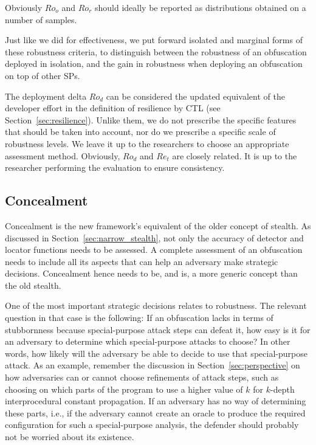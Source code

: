 \vspace{0.2cm}

Obviously $Ro_o$ and $Ro_r$ should ideally be reported as distributions obtained on a number of samples.

Just like we did for effectiveness, we put forward isolated and marginal forms of these robustness criteria, to distinguish between the robustness of an obfuscation deployed in isolation, and the gain in robustness when deploying an obfuscation on top of other SPs. 

The deployment delta $Ro_d$ can be considered the updated equivalent of the developer effort in the definition of resilience by CTL (see Section~\ref{sec:resilience}). Unlike them, we do not prescribe the specific features that should be taken into account, nor do we prescribe a specific scale of robustness levels. We leave it up to the researchers to choose an appropriate assessment method. 
Obviously, $Ro_d$ and $Re_t$ are closely related. It is up to the researcher performing the evaluation to ensure consistency. 



\subsection{Concealment}
Concealment is the new framework's equivalent of the older concept of stealth. As discussed in Section~\ref{sec:narrow_stealth}, not only the accuracy of detector and locator functions needs to be assessed. A complete assessment of an obfuscation needs to include all its aspects that can help an adversary make strategic decisions. Concealment hence needs to be, and is, a more generic concept than the old stealth. 
 
One of the most important strategic decisions relates to robustness. The relevant question in that case is the following: If an obfuscation lacks in terms of stubbornness because special-purpose attack steps can defeat it, how easy is it for an adversary to determine which special-purpose attacks to choose? In other words, how likely will the adversary be able to decide to use that special-purpose attack. As an example, remember the discussion in Section~\ref{sec:perspective} on how adversaries can or cannot choose refinements of attack steps, such as choosing on which parts of the program to use a higher value of $k$ for $k$-depth interprocedural constant propagation. If an adversary has no way of determining these parts, i.e., if the adversary cannot create an oracle to produce the required configuration for such a special-purpose analysis, the defender should probably not be worried about its existence. 

